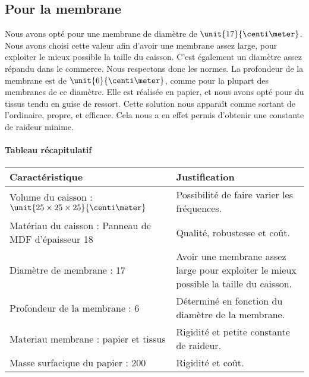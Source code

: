 \subsection{Pour la membrane}
Nous avons opté pour une membrane de diamètre de $\unit{17}{\centi\meter}$. Nous avons choisi cette valeur afin 
d'avoir une membrane assez large, pour exploiter le mieux possible la taille du caisson. C'est également un
diamètre assez répandu dans le commerce\cite{tlhp}. Nous respectons donc les normes.
La profondeur de la membrane est de $\unit{6}{\centi\meter}$, comme pour la plupart des membranes de ce
diamètre\cite{tlhp}. Elle est réalisée en papier, et nous avons opté pour du tissus tendu en guise de ressort.
Cette solution nous apparaît comme sortant de l'ordinaire, propre, et efficace. Cela nous a en effet permis
d'obtenir une constante de raideur minime.


\paragraph{Tableau récapitulatif}

\begin{table}
	\centering
	\begin{tabularx}{\textwidth}{|X|X|}
		\hline
			 \textbf{Caractéristique} & \textbf{Justification} \\
		\hline
			Volume du caisson : $\unit{25\times25\times25}{\centi\meter}$ & Possibilité de faire varier les fréquences.  \\
		\hline
			Matériau du caisson : Panneau de 	MDF
			d'épaisseur \unit{18}{\milli\meter} & Qualité, robustesse et coût. \\
		\hline
			Diamètre de membrane : \unit{17}{\centi\meter} & Avoir une membrane assez large pour exploiter le mieux possible la taille du caisson. \\
		\hline
			Profondeur de la membrane : \unit{6}{\centi\meter} & Déterminé en fonction du diamètre de la membrane. \\
		\hline
			Materiau membrane : papier et tissus & Rigidité et petite constante de raideur. \\
		\hline
			Masse surfacique du papier : \unit{200}{\gram\per\meter\squared} & Rigidité et coût. \\
		\hline
	\end{tabularx}
\end{table}



